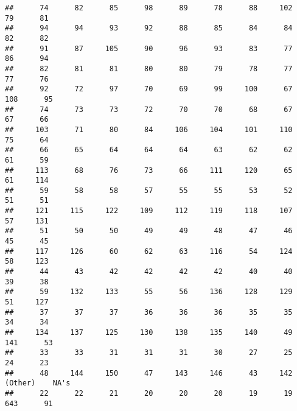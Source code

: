 \documentclass[
]{article}
\newenvironment{Shaded}{\begin{snugshade}}{\end{snugshade}}
\newcommand{\CommentTok}[1]{\textcolor[rgb]{0.56,0.35,0.01}{\textit{#1}}}
\newcommand{\KeywordTok}[1]{\textcolor[rgb]{0.13,0.29,0.53}{\textbf{#1}}}
\newcommand{\NormalTok}[1]{#1}
\newcommand{\OperatorTok}[1]{\textcolor[rgb]{0.81,0.36,0.00}{\textbf{#1}}}
\newcommand{\StringTok}[1]{\textcolor[rgb]{0.31,0.60,0.02}{#1}}
\begin{document}
\begin{Shaded}
\end{Shaded}

\begin{verbatim}
##      74      82      85      98      89      78      88     102      79      81 
##      94      94      93      92      88      85      84      84      82      82 
##      91      87     105      90      96      93      83      77      86      94 
##      82      81      81      80      80      79      78      77      77      76 
##      92      72      97      70      69      99     100      67     108      95 
##      74      73      73      72      70      70      68      67      67      66 
##     103      71      80      84     106     104     101     110      75      64 
##      66      65      64      64      64      63      62      62      61      59 
##     113      68      76      73      66     111     120      65      61     114 
##      59      58      58      57      55      55      53      52      51      51 
##     121     115     122     109     112     119     118     107      57     131 
##      51      50      50      49      49      48      47      46      45      45 
##     117     126      60      62      63     116      54     124      58     123 
##      44      43      42      42      42      42      40      40      39      38 
##      59     132     133      55      56     136     128     129      51     127 
##      37      37      37      36      36      36      35      35      34      34 
##     134     137     125     130     138     135     140      49     141      53 
##      33      33      31      31      31      30      27      25      24      23 
##      48     144     150      47     143     146      43     142 (Other)    NA's 
##      22      22      21      20      20      20      19      19     643      91
\end{verbatim}

\begin{Shaded}
\end{Shaded}
\end{document}

